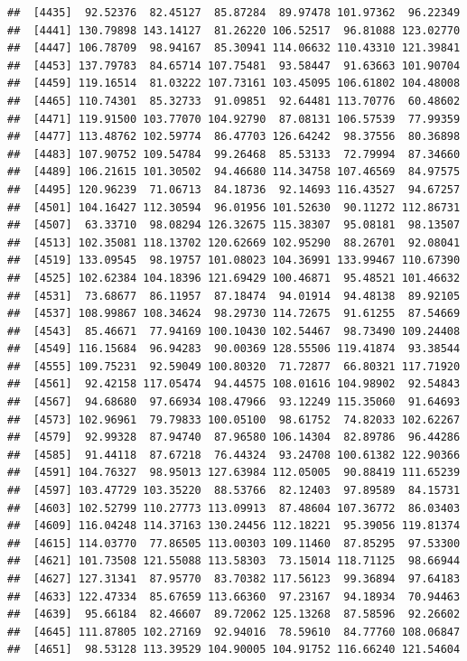 \documentclass[
]{article}
\begin{document}
\begin{verbatim}
##  [4435]  92.52376  82.45127  85.87284  89.97478 101.97362  96.22349
##  [4441] 130.79898 143.14127  81.26220 106.52517  96.81088 123.02770
##  [4447] 106.78709  98.94167  85.30941 114.06632 110.43310 121.39841
##  [4453] 137.79783  84.65714 107.75481  93.58447  91.63663 101.90704
##  [4459] 119.16514  81.03222 107.73161 103.45095 106.61802 104.48008
##  [4465] 110.74301  85.32733  91.09851  92.64481 113.70776  60.48602
##  [4471] 119.91500 103.77070 104.92790  87.08131 106.57539  77.99359
##  [4477] 113.48762 102.59774  86.47703 126.64242  98.37556  80.36898
##  [4483] 107.90752 109.54784  99.26468  85.53133  72.79994  87.34660
##  [4489] 106.21615 101.30502  94.46680 114.34758 107.46569  84.97575
##  [4495] 120.96239  71.06713  84.18736  92.14693 116.43527  94.67257
##  [4501] 104.16427 112.30594  96.01956 101.52630  90.11272 112.86731
##  [4507]  63.33710  98.08294 126.32675 115.38307  95.08181  98.13507
##  [4513] 102.35081 118.13702 120.62669 102.95290  88.26701  92.08041
##  [4519] 133.09545  98.19757 101.08023 104.36991 133.99467 110.67390
##  [4525] 102.62384 104.18396 121.69429 100.46871  95.48521 101.46632
##  [4531]  73.68677  86.11957  87.18474  94.01914  94.48138  89.92105
##  [4537] 108.99867 108.34624  98.29730 114.72675  91.61255  87.54669
##  [4543]  85.46671  77.94169 100.10430 102.54467  98.73490 109.24408
##  [4549] 116.15684  96.94283  90.00369 128.55506 119.41874  93.38544
##  [4555] 109.75231  92.59049 100.80320  71.72877  66.80321 117.71920
##  [4561]  92.42158 117.05474  94.44575 108.01616 104.98902  92.54843
##  [4567]  94.68680  97.66934 108.47966  93.12249 115.35060  91.64693
##  [4573] 102.96961  79.79833 100.05100  98.61752  74.82033 102.62267
##  [4579]  92.99328  87.94740  87.96580 106.14304  82.89786  96.44286
##  [4585]  91.44118  87.67218  76.44324  93.24708 100.61382 122.90366
##  [4591] 104.76327  98.95013 127.63984 112.05005  90.88419 111.65239
##  [4597] 103.47729 103.35220  88.53766  82.12403  97.89589  84.15731
##  [4603] 102.52799 110.27773 113.09913  87.48604 107.36772  86.03403
##  [4609] 116.04248 114.37163 130.24456 112.18221  95.39056 119.81374
##  [4615] 114.03770  77.86505 113.00303 109.11460  87.85295  97.53300
##  [4621] 101.73508 121.55088 113.58303  73.15014 118.71125  98.66944
##  [4627] 127.31341  87.95770  83.70382 117.56123  99.36894  97.64183
##  [4633] 122.47334  85.67659 113.66360  97.23167  94.18934  70.94463
##  [4639]  95.66184  82.46607  89.72062 125.13268  87.58596  92.26602
##  [4645] 111.87805 102.27169  92.94016  78.59610  84.77760 108.06847
##  [4651]  98.53128 113.39529 104.90005 104.91752 116.66240 121.54604

\end{verbatim}
\end{document}
